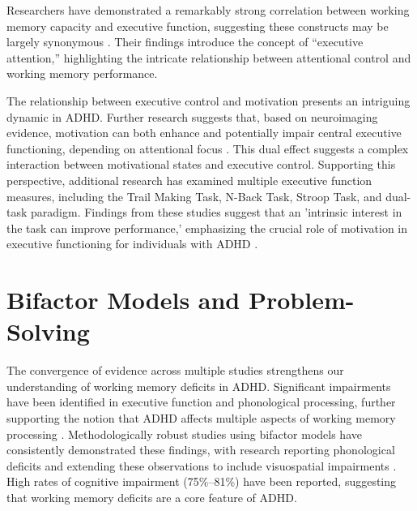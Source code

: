 \documentclass[stu]{apa7}
\begin{document}
Researchers have demonstrated a remarkably strong correlation between working memory capacity and executive function, suggesting these constructs may be largely synonymous \parencite{mccabe_relationship_2010}. Their findings introduce the concept of ``executive attention,'' highlighting the intricate relationship between attentional control and working memory performance.

The relationship between executive control and motivation presents an intriguing dynamic in ADHD. Further research suggests that, based on neuroimaging evidence, motivation can both enhance and potentially impair central executive functioning, depending on attentional focus \parencite{pessoa_how_2009}. This dual effect suggests a complex interaction between motivational states and executive control. Supporting this perspective, additional research has examined multiple executive function measures, including the Trail Making Task, N-Back Task, Stroop Task, and dual-task paradigm. Findings from these studies suggest that an 'intrinsic interest in the task can improve performance,' emphasizing the crucial role of motivation in executive functioning for individuals with ADHD \parencite{elosua_differences_2017}.

\section{Bifactor Models and Problem-Solving}

The convergence of evidence across multiple studies strengthens our understanding of working memory deficits in ADHD. Significant impairments have been identified in executive function and phonological processing, further supporting the notion that ADHD affects multiple aspects of working memory processing \parencite{elosua_differences_2017, fried_clinical_2016}. Methodologically robust studies using bifactor models have consistently demonstrated these findings, with research reporting phonological deficits \parencite{friedman_reading_2017, raiker_phonological_2019} and extending these observations to include visuospatial impairments \parencite{kofler_working_2020}. High rates of cognitive impairment (75\%–81\%) have been reported, suggesting that working memory deficits are a core feature of ADHD.
\end{document}
